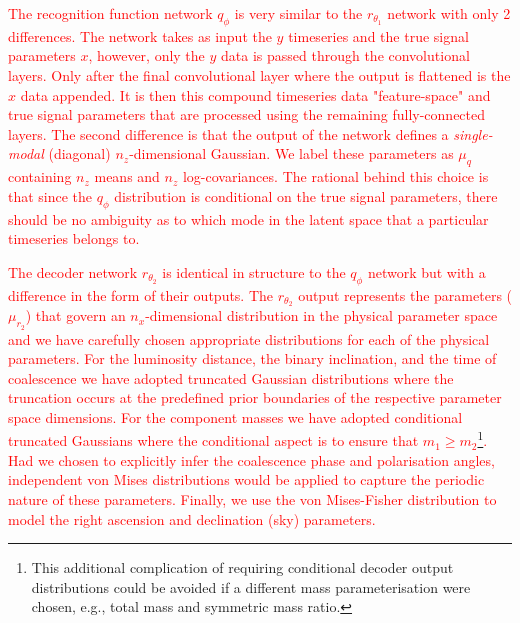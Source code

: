 \documentclass[%
showpacs,
nofootinbib,
 amsmath,amssymb,
 aps,
 twocolumn,
 prl,
 reprint,
floatfix,
]{revtex4-1}
\newcommand{\new}[1]{\textcolor{red}{#1}}
\begin{document}
%
% 
\new{The recognition function network $q_{\phi}$ is very similar to the
$r_{\theta_1}$ network with only 2 differences. The network takes as input the
$y$ timeseries and the true signal parameters $x$, however, only the $y$ data
is passed through the convolutional layers. Only after the final convolutional
layer where the output is flattened is the $x$ data appended. It is then this
compound timeseries data "feature-space" and true signal parameters that are
processed using the remaining fully-connected layers. The second difference is
that the output of the network defines a \emph{single-modal} (diagonal)
$n_z$-dimensional Gaussian. We label these parameters as $\mu_{q}$ containing
$n_z$ means and $n_z$ log-covariances. The rational behind this choice is that
since the $q_{\phi}$ distribution is conditional on the true signal parameters,
there should be no ambiguity as to which mode in the latent space that a
particular timeseries belongs to.}      

%
%
\new{The decoder network $r_{\theta_2}$ is identical in structure to the
$q_{\phi}$ network but with a difference in the form of their outputs. The
$r_{\theta_2}$ output represents the parameters ($\mu_{r_2}$) that govern an
$n_x$-dimensional distribution in the physical parameter space and we have
carefully chosen appropriate distributions for each of the physical parameters.
For the luminosity distance, the binary inclination, and the time of
coalescence we have adopted truncated Gaussian distributions where the
truncation occurs at the predefined prior boundaries of the respective
parameter space dimensions. For the component masses we have adopted
conditional truncated Gaussians where the conditional aspect is to ensure that
$m_{1}\geq m_{2}$\footnote{This additional complication of requiring conditional
decoder output distributions could be avoided if a different mass
parameterisation were chosen, e.g., total mass and symmetric mass ratio.}. Had
we chosen to explicitly infer the coalescence phase and polarisation angles,
independent von Mises distributions would be applied to capture the periodic
nature of these parameters. Finally, we use the von Mises-Fisher distribution
to model the right ascension and declination (sky) parameters.}     
\end{document}
